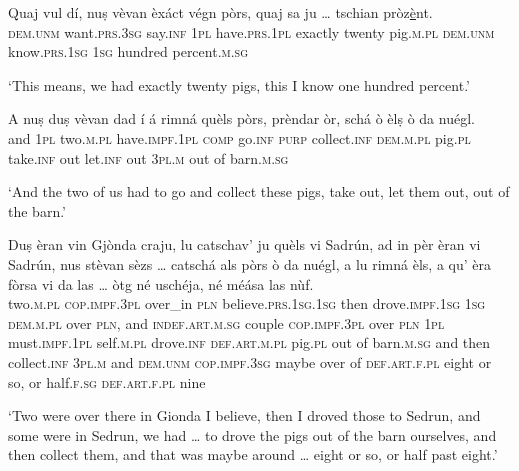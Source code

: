 \begin{linenumbers}
	\gll    Quaj vul dí, nuṣ vèvan èxáct végn pòrs, quaj sa ju … tschian pròz\underline{è}nt.\\
	\textsc{dem.unm} want.\textsc{prs.3sg} say.\textsc{inf} \textsc{1pl} have.\textsc{prs.1pl} exactly twenty pig.\textsc{m.pl}  \textsc{dem.unm} know.\textsc{prs.1sg} \textsc{1sg} {} hundred percent.\textsc{m.sg}\\
\end{linenumbers}
\medskip
\glt `This means, we had exactly twenty pigs, this I know one hundred percent.'
\medskip

\begin{linenumbers}
	\gll    A nuṣ duṣ vèvan dad í á rimná quèls pòrs, prèndar òr, schá ò èlṣ ò da nuégl.\\
	and \textsc{1pl} two.\textsc{m.pl} have.\textsc{impf.1pl} \textsc{comp} go.\textsc{inf}  \textsc{purp} collect.\textsc{inf} \textsc{dem.m.pl} pig.\textsc{pl} take.\textsc{inf} out  let.\textsc{inf} out \textsc{3pl.m} out of barn.\textsc{m.sg}\\
\end{linenumbers}
\medskip
\glt `And the two of us had to go and collect these pigs, take out, let them out, out of the barn.'
\medskip

\begin{linenumbers}
	\gll    Duṣ èran vin Gjònda craju, lu catschav' ju  quèls vi Sadrún, ad in pèr èran vi Sadrún, nus stèvan sèzs … catschá als pòrs ò da nuégl, a lu rimná èls, a qu’ èra fòrsa vi da las … òtg né uschéja, né méása las nùf.\\
	two.\textsc{m.pl} \textsc{cop.impf.3pl} over\_in \textsc{pln} believe.\textsc{prs.1sg.1sg}  then drove.\textsc{impf.1sg} \textsc{1sg} \textsc{dem.m.pl} over  \textsc{pln}, and \textsc{indef.art.m.sg} couple \textsc{cop.impf.3pl} over \textsc{pln} \textsc{1pl} must.\textsc{impf.1pl} self.\textsc{m.pl} {} drove.\textsc{inf} \textsc{def.art.m.pl} pig.\textsc{pl} out of barn.\textsc{m.sg} and then collect.\textsc{inf} \textsc{3pl.m} and \textsc{dem.unm} \textsc{cop.impf.3sg} maybe over of \textsc{def.art.f.pl} {} eight or so, or half.\textsc{f.sg} \textsc{def.art.f.pl} nine\\
\end{linenumbers}
\medskip
\glt `Two were over there in Gionda I believe, then I droved those to Sedrun, and some were in Sedrun, we had … to drove the pigs out of the barn ourselves, and then collect them, and that was maybe around … eight or so, or half past eight.'
\medskip

